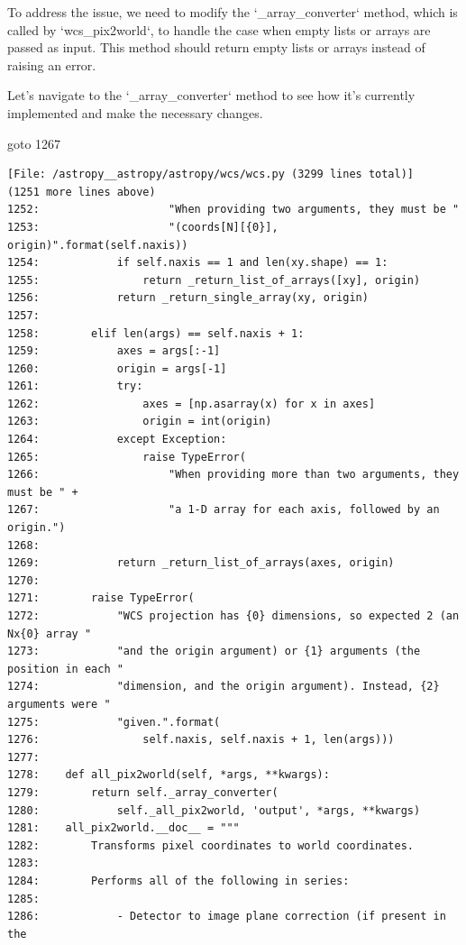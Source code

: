 {\begin{agentbox}
To address the issue, we need to modify the `\_array\_converter` method, which is called by `wcs\_pix2world`, to handle the case when empty lists or arrays are passed as input. This method should return empty lists or arrays instead of raising an error.



Let's navigate to the `\_array\_converter` method to see how it's currently implemented and make the necessary changes.

\hrulefill
\begin{CodeVerbatim}[breaklines=true, breakanywhere=true]
goto 1267
\end{CodeVerbatim}
\end{agentbox}
\begin{observationbox}\begin{Verbatim}[breaklines=true, breakanywhere=true]
[File: /astropy__astropy/astropy/wcs/wcs.py (3299 lines total)]
(1251 more lines above)
1252:                    "When providing two arguments, they must be "
1253:                    "(coords[N][{0}], origin)".format(self.naxis))
1254:            if self.naxis == 1 and len(xy.shape) == 1:
1255:                return _return_list_of_arrays([xy], origin)
1256:            return _return_single_array(xy, origin)
1257:
1258:        elif len(args) == self.naxis + 1:
1259:            axes = args[:-1]
1260:            origin = args[-1]
1261:            try:
1262:                axes = [np.asarray(x) for x in axes]
1263:                origin = int(origin)
1264:            except Exception:
1265:                raise TypeError(
1266:                    "When providing more than two arguments, they must be " +
1267:                    "a 1-D array for each axis, followed by an origin.")
1268:
1269:            return _return_list_of_arrays(axes, origin)
1270:
1271:        raise TypeError(
1272:            "WCS projection has {0} dimensions, so expected 2 (an Nx{0} array "
1273:            "and the origin argument) or {1} arguments (the position in each "
1274:            "dimension, and the origin argument). Instead, {2} arguments were "
1275:            "given.".format(
1276:                self.naxis, self.naxis + 1, len(args)))
1277:
1278:    def all_pix2world(self, *args, **kwargs):
1279:        return self._array_converter(
1280:            self._all_pix2world, 'output', *args, **kwargs)
1281:    all_pix2world.__doc__ = """
1282:        Transforms pixel coordinates to world coordinates.
1283:
1284:        Performs all of the following in series:
1285:
1286:            - Detector to image plane correction (if present in the

\end{Verbatim}
\end{observationbox}}
